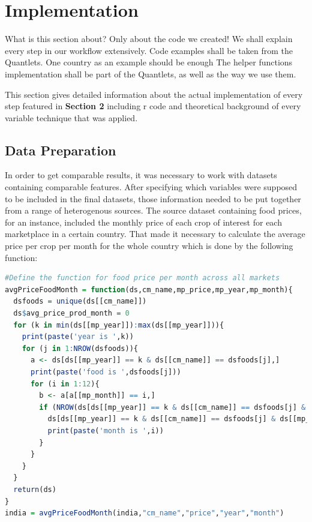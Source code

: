 \documentclass[12pt,a4paper,english]{article}
\begin{document}
\section{Implementation}

What is this section about? Only about the code we created!
We shall explain every step in our workflow extensively.
Code examples shall be taken from the Quantlets. One country as an example should be enough
The helper functions implementation shall be part of the Quantlets, as well as the way we use them.

This section gives detailed information about the actual implementation of every step featured in \textbf{Section 2} including r code and theoretical background of every variable technique that was applied.



\subsection{Data Preparation}

In order to get comparable results, it was necessary to work with datasets containing comparable features. After specifying which variables were supposed to be included in the final datasets, those information needed to be put together from a range of heterogenous sources. 
The source dataset containing food prices, for an instance, included the monthly price of each crop of interest for each marketplace in a certain country. That made it necessary to calculate the average price per crop per month for the whole country which is done by the following function:


\begin{lstlisting}[language= R, captionpos=b,caption=\href{https://github.com/jaidikam/sps_ws1718/tree/master/Qfolder1}{SPL\_Q1\_india\_preparation}]
#Define the function for food price per month across all markets
avgPriceFoodMonth = function(ds,cm_name,mp_price,mp_year,mp_month){
  dsfoods = unique(ds[[cm_name]])
  ds$avg_price_prod_month = 0
  for (k in min(ds[[mp_year]]):max(ds[[mp_year]])){
    print(paste('year is ',k))
    for (j in 1:NROW(dsfoods)){
      a <- ds[ds[[mp_year]] == k & ds[[cm_name]] == dsfoods[j],]
      print(paste('food is ',dsfoods[j]))
      for (i in 1:12){
        b <- a[a[[mp_month]] == i,]
        if (NROW(ds[ds[[mp_year]] == k & ds[[cm_name]] == dsfoods[j] & ds[[mp_month]] == i,]$avg_price_prod_month) >0) {
          ds[ds[[mp_year]] == k & ds[[cm_name]] == dsfoods[j] & ds[[mp_month]] == i,]$avg_price_prod_month =  sum(b[[mp_price]])/ NROW(b)
          print(paste('month is ',i))  
        } 
      }
    }
  }
  return(ds)
}
india = avgPriceFoodMonth(india,"cm_name","price","year","month")
\end{lstlisting}
\end{document}
